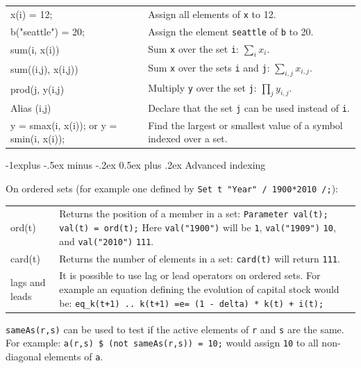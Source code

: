 \documentclass[10pt,landscape,a4paper]{article}
\makeatletter
\renewcommand{\subsection}{\@startsection{subsection}{2}{0mm}%
                                {-1explus -.5ex minus -.2ex}%
                                {0.5ex plus .2ex}%
                                {\normalfont\normalsize\bfseries}}
\makeatother
\begin{document}
\begin{multicols}{2}
\begin{tabularx}{\columnwidth}{@{}>{\ttfamily}lX@{}}
x(i) = 12; & Assign all elements of \texttt{x} to 12.\\
b("seattle") = 20; & Assign the element \texttt{seattle} of \texttt{b} to 20.\\
sum(i, x(i)) & Sum \texttt{x} over the set \texttt{i}: $\sum_{i}x_{i}$.\\
sum((i,j), x(i,j)) & Sum \texttt{x} over the sets \texttt{i} and \texttt{j}: $\sum_{i,j}x_{i,j}$.\\
prod(j, y(i,j) & Multiply \texttt{y} over the set \texttt{j}:
$\prod_{j}y_{i,j}$.\\
Alias (i,j) & Declare that the set \texttt{j} can be used instead of
\texttt{i}.\\
y = smax(i, x(i)); \textrm{or} y = smin(i, x(i)); & Find the largest or smallest
value of a symbol indexed over a set.
\end{tabularx}

\subsection{Advanced indexing}

On ordered sets (for example one defined by \texttt{Set t "Year" / 1900*2010 /;}):
\begin{tabularx}{\columnwidth}{@{}>{\ttfamily}l>{\raggedright\arraybackslash}X@{}}
ord(t)& Returns the position of a member in a set:\linebreak{}
\texttt{Parameter val(t);}\linebreak{}
\texttt{val(t) = ord(t);}\linebreak{}
Here \texttt{val("1900")} will be \texttt{1}, \texttt{val("1909")} \texttt{10}, and \texttt{val("2010")} \texttt{111}.\\
card(t) & Returns the number of elements in a set: \texttt{card(t)} will return \texttt{111}.\\
\textrm{lags and leads} & It is possible to use lag or lead operators on ordered sets. For example an equation defining the evolution of capital stock would
be:\linebreak{}
\texttt{eq\_k(t+1) .. k(t+1) =e= (1 - delta) * k(t) + i(t);}
\end{tabularx}

\texttt{sameAs(r,s)} can be used to test if the active elements of \texttt{r} and \texttt{s} are the same. For example: \texttt{a(r,s) \$ (not sameAs(r,s)) = 10;} would assign \texttt{10} to all non-diagonal elements of \texttt{a}.


\end{multicols}
\end{document}
